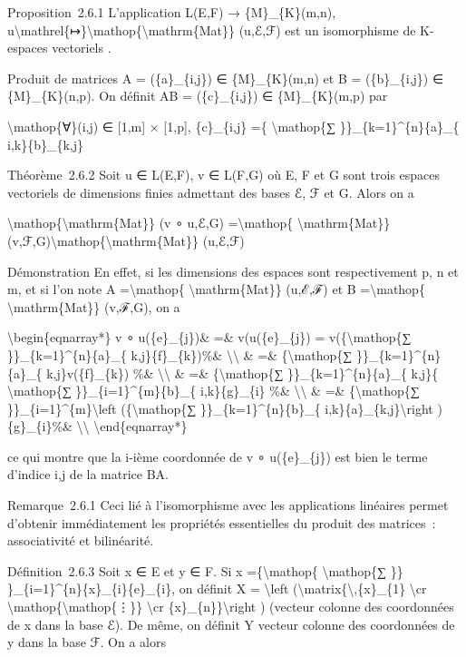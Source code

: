 \documentclass[]{article}
\begin{document}
Proposition~2.6.1 L'application L(E,F) → \{M\}\_\{K\}(m,n),
u\textbackslash{}mathrel\{↦\}\textbackslash{}mathop\{\textbackslash{}mathrm\{Mat\}\}
(u,ℰ,ℱ) est un isomorphisme de K-espaces vectoriels .

Produit de matrices A = (\{a\}\_\{i,j\}) ∈ \{M\}\_\{K\}(m,n) et B =
(\{b\}\_\{i,j\}) ∈ \{M\}\_\{K\}(n,p). On définit AB = (\{c\}\_\{i,j\}) ∈
\{M\}\_\{K\}(m,p) par

\textbackslash{}mathop\{∀\}(i,j) ∈ {[}1,m{]} × {[}1,p{]}, \{c\}\_\{i,j\}
=\{ \textbackslash{}mathop\{∑ \}\}\_\{k=1\}\^{}\{n\}\{a\}\_\{
i,k\}\{b\}\_\{k,j\}

Théorème~2.6.2 Soit u ∈ L(E,F), v ∈ L(F,G) où E, F et G sont trois
espaces vectoriels de dimensions finies admettant des bases ℰ, ℱ et G.
Alors on a

\textbackslash{}mathop\{\textbackslash{}mathrm\{Mat\}\} (v ∘ u,ℰ,G)
=\textbackslash{}mathop\{ \textbackslash{}mathrm\{Mat\}\}
(v,ℱ,G)\textbackslash{}mathop\{\textbackslash{}mathrm\{Mat\}\} (u,ℰ,ℱ)

Démonstration En effet, si les dimensions des espaces sont
respectivement p, n et m, et si l'on note A =\textbackslash{}mathop\{
\textbackslash{}mathrm\{Mat\}\} (u,ℰ,ℱ) et B =\textbackslash{}mathop\{
\textbackslash{}mathrm\{Mat\}\} (v,ℱ,G), on a

\textbackslash{}begin\{eqnarray*\} v ∘ u(\{e\}\_\{j\})\& =\&
v(u(\{e\}\_\{j\}) = v(\{\textbackslash{}mathop\{∑
\}\}\_\{k=1\}\^{}\{n\}\{a\}\_\{ k,j\}\{f\}\_\{k\})\%\&
\textbackslash{}\textbackslash{} \& =\& \{\textbackslash{}mathop\{∑
\}\}\_\{k=1\}\^{}\{n\}\{a\}\_\{ k,j\}v(\{f\}\_\{k\}) \%\&
\textbackslash{}\textbackslash{} \& =\& \{\textbackslash{}mathop\{∑
\}\}\_\{k=1\}\^{}\{n\}\{a\}\_\{ k,j\}\{ \textbackslash{}mathop\{∑
\}\}\_\{i=1\}\^{}\{m\}\{b\}\_\{ i,k\}\{g\}\_\{i\} \%\&
\textbackslash{}\textbackslash{} \& =\& \{\textbackslash{}mathop\{∑
\}\}\_\{i=1\}\^{}\{m\}\textbackslash{}left (\{\textbackslash{}mathop\{∑
\}\}\_\{k=1\}\^{}\{n\}\{b\}\_\{ i,k\}\{a\}\_\{k,j\}\textbackslash{}right
)\{g\}\_\{i\}\%\& \textbackslash{}\textbackslash{}
\textbackslash{}end\{eqnarray*\}

ce qui montre que la i-ième coordonnée de v ∘ u(\{e\}\_\{j\}) est bien
le terme d'indice i,j de la matrice BA.

Remarque~2.6.1 Ceci lié à l'isomorphisme avec les applications linéaires
permet d'obtenir immédiatement les propriétés essentielles du produit
des matrices~: associativité et bilinéarité.

Définition~2.6.3 Soit x ∈ E et y ∈ F. Si x =\{\textbackslash{}mathop\{
\textbackslash{}mathop\{∑ \}\}
\}\_\{i=1\}\^{}\{n\}\{x\}\_\{i\}\{e\}\_\{i\}, on définit X =
\textbackslash{}left
(\textbackslash{}matrix\{\textbackslash{},\{x\}\_\{1\}
\textbackslash{}cr \textbackslash{}mathop\{\textbackslash{}mathop\{⋮\}\}
\textbackslash{}cr \{x\}\_\{n\}\}\textbackslash{}right ) (vecteur
colonne des coordonnées de x dans la base ℰ). De même, on définit Y
vecteur colonne des coordonnées de y dans la base ℱ. On a alors
\end{document}
